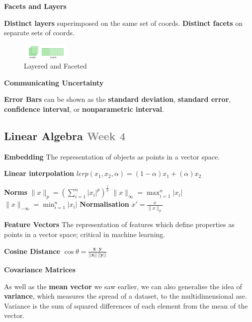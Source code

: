 \documentclass{article}
\begin{document}
\vspace{\baselineskip}

\textbf{Facets and Layers}

\textbf{Distinct layers} superimposed on the same set of coords.
\textbf{Distinct facets} on separate sets of coords.

\begin{figure}[h]
    \centering
    \includegraphics[width=0.2\textwidth]{assets/layered-faceted.png}
    \caption{Layered and Faceted}\label{fig:layered-faceted}
\end{figure}

\vspace{\baselineskip}

\textbf{Communicating Uncertainty}

\textbf{Error Bars} can be shown as the \textbf{standard deviation}, \textbf{standard error}, \textbf{confidence interval}, or \textbf{nonparametric interval}.

\clearpage

\subsection*{Linear Algebra \small\textcolor{gray}{Week 4}}

\textbf{Embedding} The representation of objects as points in a vector space.

\textbf{Linear interpolation}
$lerp(x_1, x_2, \alpha) = (1 - \alpha)x_1 + (\alpha)x_2$

\textbf{Norms}
$\|x\|_p = {(\sum_{i=1}^{n} |x_i|^p)}^{\frac{1}{p}}$
$\|x\|_\infty = \max_{i=1}^{n} |x_i|$
$\|x\|_{-\infty} = \min_{i=1}^{n} |x_i|$
\textbf{Normalisation} $x' = \frac{x}{\|x\|_p}$

\textbf{Feature Vectors} The representation of features which define properties as points
in a vector space; critical in machine learning.

\textbf{Cosine Distance}
$\cos \theta = \frac{\mathbf{x} \cdot \mathbf{y}}{||\mathbf{x}|| \, ||\mathbf{y}||}$

\textbf{Covariance Matrices}

As well as the \textbf{mean vector} we saw earlier, we can also generalise the idea of \textbf{variance},
which measures the spread of a dataset, to the multidimensional ase. Variance is the sum of squared differences
of each element from the mean of the vector.
\end{document}
